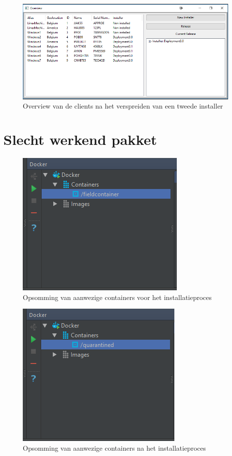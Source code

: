 \begin{figure}[!ht]
\centering
\includegraphics[width=\textwidth,keepaspectratio]{afbeelding/testMultiClient/OverviewNaDeployment2.png}
\caption{Overview van de clients na het verspreiden van een tweede installer}
\label{fig:testClient:overviewNaDeployment2}
\end{figure}

\clearpage
\section{Slecht werkend pakket}\label{sec:badPackage}
\begin{figure}[!ht]
\centering
\includegraphics[scale=1]{afbeelding/badPackage/begin.png}
\caption{Opsomming van aanwezige containers voor het installatieproces}
\label{fig:badPackage:begin}
\end{figure}

\begin{figure}[!ht]
\centering
\includegraphics[scale=1]{afbeelding/badPackage/einde.png}
\caption{Opsomming van aanwezige containers na het installatieproces}
\label{fig:badPackage:einde}
\end{figure}

